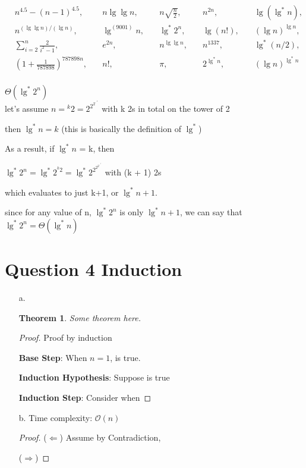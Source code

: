 \documentclass[11pt,fleqn]{article}
\newcommand{\bigO}{\ensuremath{\mathcal{O}}}
\newcommand{\Base}{\textbf{Base Step}: }
\newcommand{\IH}{\textbf{Induction Hypothesis}: }
\newcommand{\IS}{\textbf{Induction Step}: }
\newtheorem*{theorem}{Theorem}
\theoremstyle{definition}
\theoremstyle{remark}
\begin{document}
\[
\begin{aligned}
& n^{4.5} - (n - 1)^{4.5}, & \quad n \lg \lg n, & \quad n\sqrt{\frac{n}{2}}, & \quad n^{2n}, & \quad \lg(\lg^*n), \\
& n^{({\lg \lg n})/({\lg n})}, & \quad \lg^{(9001)} n, & \quad \lg^*2^{n}, & \quad \lg(n!), & \quad (\lg n)^{\lg n}, \\
& \sum_{i=2}^n \frac{2}{{i}^2-1}, & \quad e^{2n}, & \quad n^{\lg \lg n}, & \quad n^{1337}, & \quad \lg^*{(n/2)}, \\
& (1 + \frac{1}{787898})^{787898n}, & \quad n!, & \quad \pi, & \quad 2^{\lg^*n}, & \quad (\lg n)^{\lg^* n}
\end{aligned}
\]\\

$\Theta(\lg^*2^n)$\\
let's assume $n = {}^k 2 = 2^{2^{2^{\cdot^{\cdot^{\cdot 2}}}}}$ with k
2s in total on the tower of 2

then $\lg^*n = k$ (this is basically the definition of $\lg^*$)

As a result, if $\lg^*n$ = k, then 

$\lg^*2^n = \lg^*{2^{{}^k 2}} = \lg^*{2^{2^{2^{2^{\cdot^{\cdot^{\cdot 2}}}}}}}$ with (k + 1) 2s

which evaluates to just k+1, or $\lg^*n + 1$.

since for any value of n, $\lg^*{2^n}$ is only $\lg^*n + 1$, we can say
that $\lg^*{2^n} = \Theta(\lg^*{n})$


\newpage
\clearpage

\section{Question 4 Induction}
\begin{enumerate}
    \item[a.]
    \begin{theorem}
        Some theorem here.
    \end{theorem}
    \begin{proof} Proof by induction
    
    \Base {When $n=1$, is true.}
    
    \IH {Suppose is true}
    
    \IS Consider when 
    \end{proof}
    
    \item[b.]
    Time complexity: $\bigO (n)$
    \begin{proof}
    ($\Leftarrow$) Assume by Contradiction,
    
    ($\Rightarrow$)
    \end{proof}
    
\end{enumerate}
\newpage
\clearpage
\end{document}
